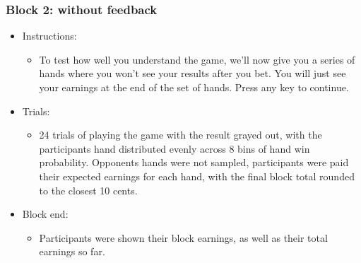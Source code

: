 \subsubsection{Block 2: without feedback}
\begin{itemize}
\item Instructions:
    \begin{itemize}
    \item To test how well you understand the game, we'll now give you a series of hands where you won't see your results after you bet. You will just see your earnings at the end of the set of hands. Press any key to continue.
    \end{itemize}
\item Trials:
    \begin{itemize}
    \item 24 trials of playing the game with the result grayed out, with the participants hand distributed evenly across 8 bins of hand win probability. Opponents hands were not sampled, participants were paid their expected earnings for each hand, with the final block total rounded to the closest 10 cents. 
    \end{itemize}
\item Block end:
    \begin{itemize}
    \item Participants were shown their block earnings, as well as their total earnings so far.
    \end{itemize}
\end{itemize}

